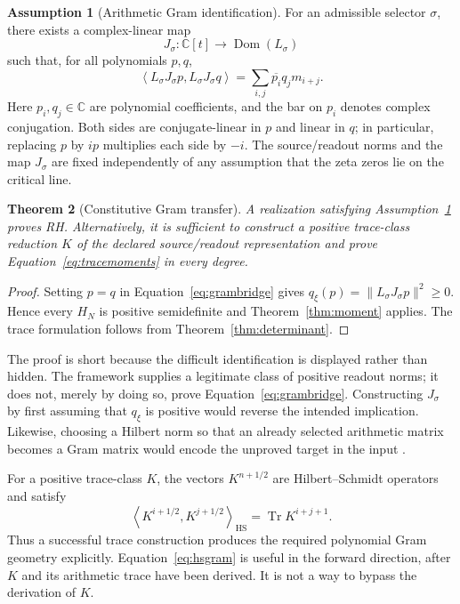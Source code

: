 \documentclass[11pt,letterpaper]{article}
\numberwithin{equation}{section}
\newtheorem{theorem}{Theorem}[section]
\theoremstyle{definition}
\newtheorem{assumption}[theorem]{Assumption}
\theoremstyle{remark}
\newcommand{\C}{\mathbb C}
\DeclareMathOperator{\Tr}{Tr}
\DeclareMathOperator{\Dom}{Dom}
\begin{document}
\begin{assumption}[Arithmetic Gram identification]
\label{ass:gram}
For an admissible selector $\sigma$, there exists a complex-linear map
\begin{equation}
 J_\sigma:\C[t]\longrightarrow\Dom(L_\sigma)
\end{equation}
such that, for all polynomials $p,q$,
\begin{equation}
 \left\langle L_\sigma J_\sigma p,L_\sigma J_\sigma q\right\rangle
 =\sum_{i,j}\overline{p_i}q_jm_{i+j}.
 \label{eq:grambridge}
\end{equation}
Here $p_i,q_j\in\C$ are polynomial coefficients, and the bar on $p_i$ denotes complex conjugation. Both sides are conjugate-linear in $p$ and linear in $q$; in particular, replacing $p$ by $ip$ multiplies each side by $-i$. The source/readout norms and the map $J_\sigma$ are fixed independently of any assumption that the zeta zeros lie on the critical line.
\end{assumption}

\begin{theorem}[Constitutive Gram transfer]
\label{thm:gramtransfer}
A realization satisfying Assumption~\ref{ass:gram} proves RH. Alternatively, it is sufficient to construct a positive trace-class reduction $K$ of the declared source/readout representation and prove Equation~\eqref{eq:tracemoments} in every degree.
\end{theorem}
\begin{proof}
Setting $p=q$ in Equation~\eqref{eq:grambridge} gives $q_\xi(p)=\|L_\sigma J_\sigma p\|^2\geq0$. Hence every $H_N$ is positive semidefinite and Theorem~\ref{thm:moment} applies. The trace formulation follows from Theorem~\ref{thm:determinant}.
\end{proof}

The proof is short because the difficult identification is displayed rather than hidden. The framework supplies a legitimate class of positive readout norms; it does not, merely by doing so, prove Equation~\eqref{eq:grambridge}. Constructing $J_\sigma$ by first assuming that $q_\xi$ is positive would reverse the intended implication. Likewise, choosing a Hilbert norm so that an already selected arithmetic matrix becomes a Gram matrix would encode the unproved target in the input \cite{tcgsoperator}.

For a positive trace-class $K$, the vectors $K^{n+1/2}$ are Hilbert--Schmidt operators and satisfy
\begin{equation}
 \left\langle K^{i+1/2},K^{j+1/2}\right\rangle_{\mathrm{HS}}
 =\Tr K^{i+j+1}.
 \label{eq:hsgram}
\end{equation}
Thus a successful trace construction produces the required polynomial Gram geometry explicitly. Equation~\eqref{eq:hsgram} is useful in the forward direction, after $K$ and its arithmetic trace have been derived. It is not a way to bypass the derivation of $K$.
\end{document}
